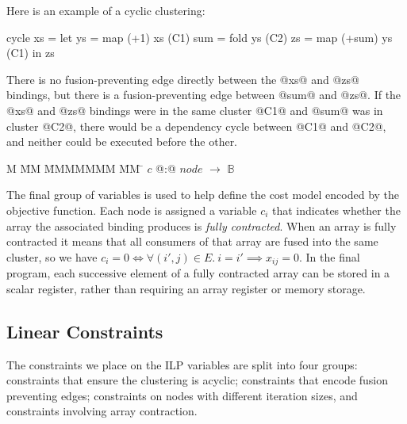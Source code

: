Here is an example of a cyclic clustering:
\begin{code}
  cycle xs  = let ys  = map (+1) xs     (C1)
                  sum = fold ys         (C2)
                  zs  = map (+sum) ys   (C1)
              in  zs
\end{code}
There is no fusion-preventing edge directly between the @xs@ and @zs@ bindings, but there is a fusion-preventing edge between @sum@ and @zs@. If the @xs@ and @zs@ bindings were in the same cluster @C1@ and @sum@ was in cluster @C2@, there would be a dependency cycle between @C1@ and @C2@, and neither could be executed before the other.
\begin{tabbing}
M   \= MM \= MMMMMMM \= MM \= \kill
$c$   \> @:@  \> $node$             \> $\to$ \> $\mathbb{B}$
\end{tabbing}
The final group of variables is used to help define the cost model encoded by the objective function. Each node is assigned a variable $c_i$ that indicates whether the array the associated binding produces is \emph{fully contracted}. When an array is fully contracted it means that all consumers of that array are fused into the same cluster, so we have $c_i = 0 \iff \forall (i',j) \in E.\ i = i' \implies x_{ij} = 0$. In the final program, each successive element of a fully contracted array can be stored in a scalar register, rather than requiring an array register or memory storage. 


\subsection{Linear Constraints}
The constraints we place on the ILP variables are split into four groups: constraints that ensure the clustering is acyclic; constraints that encode fusion preventing edges; constraints on nodes with different iteration sizes, and constraints involving array contraction. 



